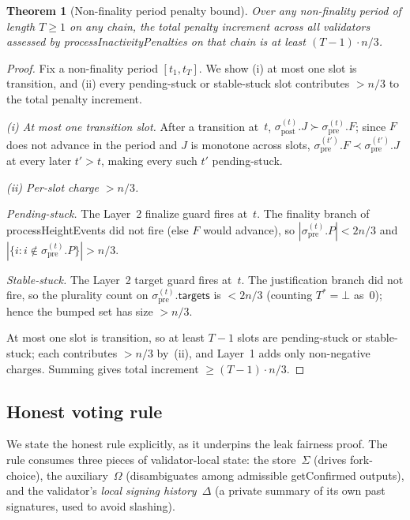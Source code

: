 \ifx\litemode\undefined\documentclass{article}\fi
\newcommand{\targets}{\mathsf{targets}}
\newcommand{\processHeightEvents}{\textsf{processHeightEvents}\xspace}
\newcommand{\processInactivityPenalties}{\textsf{processInactivityPenalties}\xspace}
\newcommand{\getConfirmed}{\textsf{getConfirmed}\xspace}
\theoremstyle{plain}
\newtheorem{theorem}{Theorem}
\theoremstyle{definition}
\theoremstyle{remark}
\begin{document}
\begin{theorem}[Non-finality period penalty bound]\label{thm:tightness}
Over any non-finality period of length $T \geq 1$ on any chain, the total penalty increment across all validators assessed by \processInactivityPenalties on that chain is at least $(T - 1) \cdot n/3$.
\end{theorem}

\begin{proof}
Fix a non-finality period $[t_1, t_T]$.
We show (i) at most one slot is transition, and (ii) every pending-stuck or stable-stuck slot contributes $> n/3$ to the total penalty increment.

\emph{(i) At most one transition slot.}
After a transition at~$t$, $\sigma_{\mathrm{post}}^{(t)}.J \succ \sigma_{\mathrm{pre}}^{(t)}.F$; since $F$ does not advance in the period and $J$ is monotone across slots, $\sigma_{\mathrm{pre}}^{(t')}.F \prec \sigma_{\mathrm{pre}}^{(t')}.J$ at every later $t' > t$, making every such $t'$ pending-stuck.

\emph{(ii) Per-slot charge $> n/3$.}

\emph{Pending-stuck.} The Layer~2 finalize guard fires at~$t$.
The finality branch of \processHeightEvents did not fire (else $F$ would advance), so $|\sigma_{\mathrm{pre}}^{(t)}.P| < 2n/3$ and $|\{i : i \notin \sigma_{\mathrm{pre}}^{(t)}.P\}| > n/3$.

\emph{Stable-stuck.} The Layer~2 target guard fires at~$t$.
The justification branch did not fire, so the plurality count on $\sigma_{\mathrm{pre}}^{(t)}.\targets$ is $< 2n/3$ (counting $T^* = \bot$ as~$0$); hence the bumped set has size $> n/3$.

At most one slot is transition, so at least $T - 1$ slots are pending-stuck or stable-stuck; each contributes $> n/3$ by~(ii), and Layer~1 adds only non-negative charges.
Summing gives total increment $\geq (T-1) \cdot n/3$.
\end{proof}

\subsection{Honest voting rule}

We state the honest rule explicitly, as it underpins the leak fairness proof.
The rule consumes three pieces of validator-local state: the store~$\Sigma$ (drives fork-choice), the auxiliary~$\Omega$ (disambiguates among admissible \getConfirmed outputs), and the validator's \emph{local signing history}~$\Delta$ (a private summary of its own past signatures, used to avoid slashing).
\end{document}
